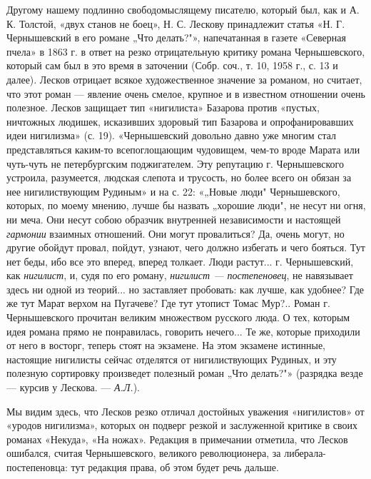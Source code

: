 Другому нашему подлинно свободомыслящему  писателю, который был, как и
А. К. Толстой, «двух станов не боец», Н. С. Лескову принадлежит статья
«Н. Г. Чернышевский в его романе „Что делать?"», напечатанная в газете
«Северная  пчела» в  1863 г.  в ответ  на резко  отрицательную критику
романа Чернышевского, который  сам был в это время  в заточении (Собр.
соч.,  т.  10,  1958  г.,  с. 13  и  далее).  Лесков  отрицает  всякое
художественное  значение  за  романом,  но  считает,  что  этот  роман
---  явление  очень смелое,  крупное  и  в известном  отношении  очень
полезное.  Лесков защищает  тип «нигилиста»  Базарова против  «пустых,
ничтожных людишек, исказивших здоровый тип Базарова и опрофанировавших
идеи  нигилизма»  (с. 19).  «Чернышевский  довольно  давно уже  многим
стал  представляться каким-то  всепоглощающим чудовищем,  чем-то вроде
Марата или  чуть-чуть не петербургским поджигателем.  Эту репутацию г.
Чернышевского  устроила, разумеется,  людская слепота  и трусость,  но
более  всего он  обязан за  нее нигилиствующим  Рудиным» и  на с.  22:
«„Новые  люди"  Чернышевского,  которых,  по моему  мнению,  лучше  бы
назвать  „хорошие  люди",  не  несут  ни  огня,  ни  меча.  Они  несут
собою  образчик внутренней  независимости и  настоящей \emph{гармонии}
взаимных  отношений.  Они  могут  провалиться?  Да,  очень  могут,  но
другие обойдут  провал, пойдут,  узнают, чего  должно избегать  и чего
бояться.  Тут нет  беды,  ибо  все это  вперед,  вперед толкает.  Люди
растут... г. Чернышевский, как \emph{нигилист}, и, судя по его роману,
\emph{нигилист  --- постепеновец},  не  навязывает здесь  ни одной  из
теорий... но заставляет пробовать: как  лучше, как удобнее? Где же тут
Марат  верхом на  Пугачеве?  Где  тут утопист  Томас  Мур?.. Роман  г.
Чернышевского  прочитан  великим  множеством  русского  люда.  О  тех,
которым идея  романа прямо не  понравилась, говорить нечего...  Те же,
которые  приходили от  него в  восторг, теперь  стоят на  экзамене. На
этом  экзамене  истинные,  настоящие  нигилисты  сейчас  отделятся  от
нигилиствующих Рудиных, и эту  полезную сортировку произведет полезный
роман  „Что  делать?"»  (разрядка  везде ---  курсив  у  Лескова.  ---
\emph{А.Л.}).

Мы  видим   здесь,  что   Лесков  резко  отличал   достойных  уважения
«нигилистов»  от  «уродов  нигилизма»,  которых он  подверг  резкой  и
заслуженной  критике в  своих романах  «Некуда», «На  ножах». Редакция
в  примечании отметила,  что  Лесков  ошибался, считая  Чернышевского,
великого революционера, за  либерала-постепеновца: тут редакция права,
об этом будет речь дальше.

